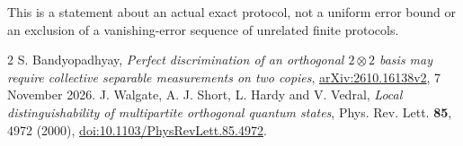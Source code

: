 \documentclass[11pt]{article}
\begin{document}
This is a statement about an actual exact protocol, not a uniform error bound or an exclusion of a vanishing-error sequence of unrelated finite protocols.
\begin{thebibliography}{2}
 S. Bandyopadhyay, \emph{Perfect discrimination of an orthogonal $2\otimes2$ basis may require collective separable measurements on two copies}, \href{https://arxiv.org/html/2610.16138v2}{arXiv:2610.16138v2}, 7 November 2026.
 J. Walgate, A. J. Short, L. Hardy and V. Vedral, \emph{Local distinguishability of multipartite orthogonal quantum states}, Phys. Rev. Lett. \textbf{85}, 4972 (2000), \href{https://doi.org/10.1103/PhysRevLett.85.4972}{doi:10.1103/PhysRevLett.85.4972}.
\end{thebibliography}
\end{document}
